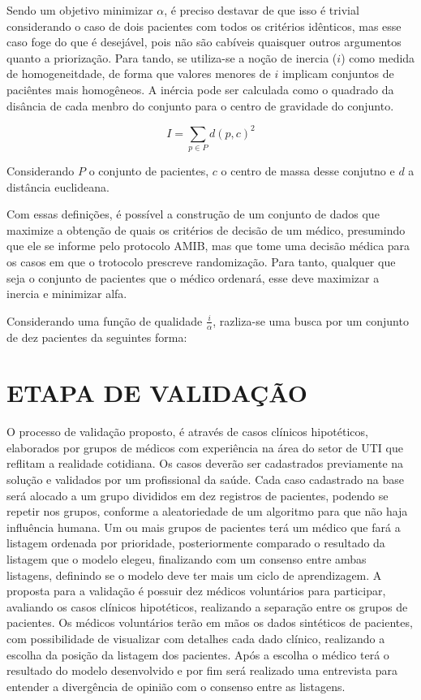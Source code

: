 \documentclass[12pt]{article}
\begin{document}
Sendo um objetivo minimizar $\alpha$, é preciso destavar de que isso é trivial considerando o caso de dois pacientes com todos os critérios idênticos, mas esse caso foge do que é desejável, pois não são cabíveis quaisquer outros argumentos quanto a priorização.
Para tando, se utiliza-se a noção de inercia ($i$) como medida de homogeneitdade, de forma que valores menores de $i$ implicam conjuntos de paciêntes mais homogêneos.
A inércia pode ser calculada como o quadrado da disância de cada menbro do conjunto para o centro de gravidade do conjunto.

\[
I = \sum_{p \in P}d(p, c)^2
\] 

Considerando $P$ o conjunto de pacientes, $c$ o centro de massa desse conjutno e $d$ a distância euclideana.

Com essas definições, é possível a construção de um conjunto de dados que maximize a obtenção de quais os critérios de decisão de um médico, presumindo que ele se informe pelo protocolo AMIB, mas que tome uma decisão médica para os casos em que o trotocolo prescreve randomização.
Para tanto, qualquer que seja o conjunto de pacientes que o médico ordenará, esse deve maximizar a inercia e minimizar alfa.

Considerando uma função de qualidade $\frac{i}{\alpha}$, razliza-se uma busca por um conjunto de dez pacientes da seguintes forma:

\section{ETAPA DE VALIDAÇÃO}
O processo de validação proposto, é através de casos clínicos hipotéticos, elaborados por grupos de médicos com experiência na área do setor de UTI que reflitam a realidade cotidiana. Os casos deverão ser cadastrados previamente na solução e validados por um profissional da saúde. Cada caso cadastrado na base será alocado a um grupo divididos em dez registros de pacientes, podendo se repetir nos grupos, conforme a aleatoriedade de um algoritmo para que não haja influência humana.
Um ou mais grupos de pacientes  terá  um  médico  que  fará  a  listagem  ordenada por prioridade, posteriormente comparado o resultado da listagem que o modelo elegeu, finalizando com um consenso entre ambas listagens, definindo se o modelo deve ter mais um ciclo de aprendizagem.
A proposta para a validação é possuir dez médicos voluntários para participar, avaliando os casos clínicos hipotéticos, realizando a separação entre os grupos de pacientes.
Os médicos voluntários terão em mãos os dados sintéticos de pacientes, com possibilidade de visualizar com detalhes cada dado clínico, realizando a escolha da posição da listagem dos pacientes. Após a escolha o médico terá o resultado do modelo desenvolvido e por fim será realizado uma entrevista para entender a divergência de opinião com o consenso entre as listagens.
\end{document}
